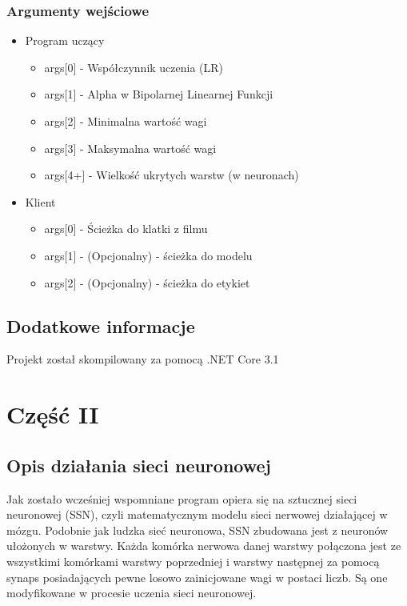 \documentclass[12pt,a4paper]{article}
\begin{document}
	\subsubsection*{Argumenty wejściowe}
	\begin{itemize}
	    \item Program uczący
	    \begin{itemize}
	        \item args[0] - Współczynnik uczenia (LR)
            \item args[1] - Alpha w Bipolarnej Linearnej Funkcji
            \item args[2] - Minimalna wartość wagi
            \item args[3] - Maksymalna wartość wagi
            \item args[4+] - Wielkość ukrytych warstw (w neuronach)
	    \end{itemize}
	    \item Klient
	    \begin{itemize}
	        \item args[0] - Ścieżka do klatki z filmu
	        \item args[1] - (Opcjonalny) - ścieżka do modelu
	        \item args[2] - (Opcjonalny) - ścieżka do etykiet
	    \end{itemize}
	\end{itemize}
	
	
	
	\subsection*{Dodatkowe informacje}
    Projekt został skompilowany za pomocą .NET Core 3.1 
	\newpage
	\section*{Część II}
    \subsection*{Opis działania sieci neuronowej} 
	\hspace{20pt} Jak zostało wcześniej wspomniane program opiera się na sztucznej sieci neuronowej (SSN), czyli matematycznym modelu sieci nerwowej działającej w mózgu. Podobnie jak ludzka sieć neuronowa, SSN zbudowana jest z neuronów ułożonych w warstwy. Każda komórka nerwowa danej warstwy połączona jest ze wszystkimi komórkami warstwy poprzedniej i warstwy następnej za pomocą synaps posiadających pewne losowo zainicjowane wagi w postaci liczb. Są one modyfikowane w procesie uczenia sieci neuronowej.
	
\end{document}
